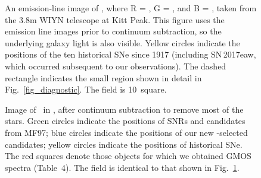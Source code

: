 

\pagebreak



\clearpage

\startlongtable



\pagebreak
%


\begin{figure}
\caption{An emission-line image of \gal, where R = \ha, G = \sii, and B = \oiii, taken from the 3.8m WIYN telescope at Kitt Peak.  This figure uses the emission line images prior to continuum subtraction, so the underlying galaxy light is also visible. Yellow circles indicate the positions of the ten historical SNe since 1917 (including SN\,2017eaw, which occurred subsequent to our observations). The dashed rectangle indicates the small region shown in detail in Fig.~\ref{fig_diagnostic}.  The field is 10\arcmin\ square. 
\label{fig_rgb_overview}}
\end{figure}

\begin{figure}
\caption{Image of \gal\ in \ha, after continuum subtraction to remove most of the stars.  Green circles indicate the positions of SNRs and candidates from MF97; blue circles indicate the positions of our new \sii-selected candidates; yellow circles indicate the positions of historical SNe.  The red squares denote those objects for which we obtained GMOS spectra (Table~4).  The field is identical to that shown in Fig.~\ref{fig_rgb_overview}. \label{fig_index_overview}}
\end{figure}



